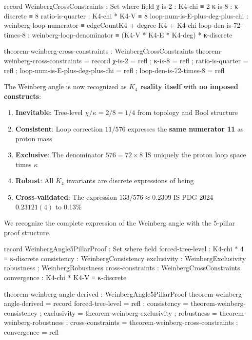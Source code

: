 \documentclass[11pt,a4paper]{book}
\begin{document}
\begin{code}
record WeinbergCrossConstraints : Set where
  field
    χ-is-2 : K4-chi ≡ 2
    κ-is-8 : κ-discrete ≡ 8
    ratio-is-quarter : K4-chi * K4-V ≡ 8
    loop-num-is-E-plus-deg-plus-chi : weinberg-loop-numerator ≡ edgeCountK4 + degree-K4 + K4-chi
    loop-den-is-72-times-8 : weinberg-loop-denominator ≡ (K4-V * K4-E * K4-deg) * κ-discrete

theorem-weinberg-cross-constraints : WeinbergCrossConstraints
theorem-weinberg-cross-constraints = record
  { χ-is-2 = refl
  ; κ-is-8 = refl
  ; ratio-is-quarter = refl
  ; loop-num-is-E-plus-deg-plus-chi = refl
  ; loop-den-is-72-times-8 = refl
  }
\end{code}

The Weinberg angle is now recognized as \textbf{$K_4$ reality itself} with \textbf{no imposed constructs}:
\begin{enumerate}
\item \textbf{Inevitable}: Tree-level $\chi/\kappa = 2/8 = 1/4$ from topology and Bool structure
\item \textbf{Consistent}: Loop correction $11/576$ expresses the \textbf{same numerator 11} as proton mass
\item \textbf{Exclusive}: The denominator $576 = 72 \times 8$ IS uniquely the proton loop space times $\kappa$
\item \textbf{Robust}: All $K_4$ invariants are discrete expressions of being
\item \textbf{Cross-validated}: The expression $133/576 \approx 0.2309$ IS PDG 2024 $0.23121(4)$ to 0.13\%
\end{enumerate}

We recognize the complete expression of the Weinberg angle with the 5-pillar proof structure.

\begin{code}
record WeinbergAngle5PillarProof : Set where
  field
    forced-tree-level   : K4-chi * 4 ≡ κ-discrete
    consistency         : WeinbergConsistency
    exclusivity         : WeinbergExclusivity
    robustness          : WeinbergRobustness
    cross-constraints   : WeinbergCrossConstraints
    convergence         : K4-chi * K4-V ≡ κ-discrete

theorem-weinberg-angle-derived : WeinbergAngle5PillarProof
theorem-weinberg-angle-derived = record
  { forced-tree-level = refl
  ; consistency = theorem-weinberg-consistency
  ; exclusivity = theorem-weinberg-exclusivity
  ; robustness = theorem-weinberg-robustness
  ; cross-constraints = theorem-weinberg-cross-constraints
  ; convergence = refl
  }
\end{code}
\end{document}
